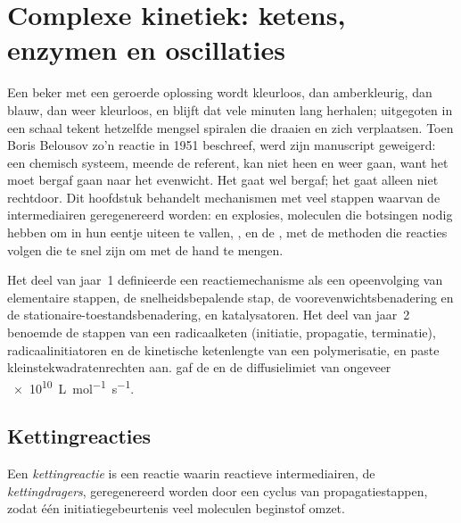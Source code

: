 \chapter{Complexe kinetiek: ketens, enzymen en oscillaties}\label{ch:b3:complex-kinetics}

Een beker met een geroerde oplossing wordt kleurloos, dan amberkleurig,
dan blauw, dan weer kleurloos, en blijft dat vele minuten lang herhalen;
uitgegoten in een schaal tekent hetzelfde mengsel spiralen die draaien en
zich verplaatsen. Toen Boris Belousov zo'n reactie in 1951 beschreef, werd
zijn manuscript geweigerd: een chemisch systeem, meende de referent, kan
niet heen en weer gaan, want het moet bergaf gaan naar het evenwicht. Het
gaat wel bergaf; het gaat alleen niet rechtdoor. Dit hoofdstuk behandelt
mechanismen met veel stappen waarvan de intermediairen geregenereerd
worden:  en explosies, moleculen die botsingen nodig hebben
om in hun eentje uiteen te vallen, , en de ,
met de methoden die reacties volgen die te snel zijn om met de hand te
mengen.

\begin{recall}
Het deel van jaar~1 definieerde een reactiemechanisme als een opeenvolging
van elementaire stappen, de snelheidsbepalende stap, de
voorevenwichtsbenadering en de stationaire-toestandsbenadering, en
katalysatoren. Het deel van jaar~2 benoemde de stappen van een
radicaalketen (initiatie, propagatie, terminatie), radicaalinitiatoren en
de kinetische ketenlengte van een polymerisatie, en paste
kleinstekwadratenrechten aan.
 gaf de  en de
diffusielimiet van ongeveer \qty{e10}{L.mol^{-1}.s^{-1}}.
\end{recall}

\section{Kettingreacties}

\begin{definition}\label{def:b3:complex-kinetics:chain}
Een \emph{kettingreactie} is een reactie waarin
reactieve intermediairen, de \emph{kettingdragers},
geregenereerd worden door een cyclus van propagatiestappen, zodat één
initiatiegebeurtenis veel moleculen beginstof omzet.
\end{definition}

